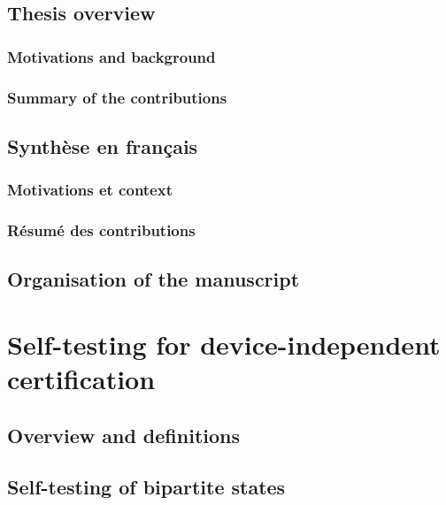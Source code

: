\documentclass[french,12pt,a4paper]{book}
\begin{document}
\printglossary[type=\acronymtype,title=Acronyms, toctitle=Acronyms]

\chapter{Thesis overview}

\section{Motivations and background}

\section{Summary of the contributions}

\chapter{Synthèse en français}

\section{Motivations et context}

\section{Résumé des contributions}

\chapter{Organisation of the manuscript}



\mainmatter

\part{Self-testing for device-independent certification}

\chapter{Overview and definitions}

\chapter{Self-testing of bipartite states}
\end{document}
